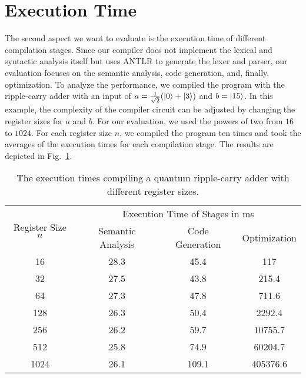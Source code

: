 \section{Execution Time}
\label{sec:eval_executionTime}
The second aspect we want to evaluate is the execution time of different compilation stages. Since our compiler does not implement the lexical and syntactic analysis itself but uses ANTLR to generate the lexer and parser, our evaluation focuses on the semantic analysis, code generation, and, finally, optimization. To analyze the performance, we compiled the program with the ripple-carry adder with an input of $a = \frac{1}{\sqrt{2}} (\ket{0} + \ket{3})$ and $b = \ket{15}$. In this example, the complexity of the compiler circuit can be adjusted by changing the register sizes for $a$ and $b$. For our evaluation, we used the powers of two from $16$ to $1024$. For each register size $n$, we compiled the program ten times and took the averages of the execution times for each compilation stage. The results are depicted in Fig.~\ref{tab:eval_executionTime}. 

\begin{table}[htp]
    \centering     
    \begin{tabular}{c|ccc}
    \multirow{2}{*}{Register Size $n$} & \multicolumn{3}{c}{Execution Time of Stages in ms}                                                  \\ \cline{2-4} 
                                       & \multicolumn{1}{c|}{Semantic Analysis} & \multicolumn{1}{c|}{Code Generation} & Optimization \\ \hline
                                       16                                 & \multicolumn{1}{c|}{28.3}                & \multicolumn{1}{c|}{45.4}              & 117          \\
    32                                 & \multicolumn{1}{c|}{27.5}                & \multicolumn{1}{c|}{43.8}              & 215.4          \\
    64                                 & \multicolumn{1}{c|}{27.3}                & \multicolumn{1}{c|}{47.8}              & 711.6          \\
    128                                & \multicolumn{1}{c|}{26.3}                & \multicolumn{1}{c|}{50.4}              & 2292.4         \\
    256                                & \multicolumn{1}{c|}{26.2}                & \multicolumn{1}{c|}{59.7}              & 10755.7        \\
    512                                & \multicolumn{1}{c|}{25.8}                & \multicolumn{1}{c|}{74.9}              & 60204.7        \\
    1024                               & \multicolumn{1}{c|}{26.1}                & \multicolumn{1}{c|}{109.1}             & 405376.6      
\end{tabular}
\caption{The execution times compiling a quantum ripple-carry adder with different register sizes.}
\label{tab:eval_executionTime}
\end{table}

